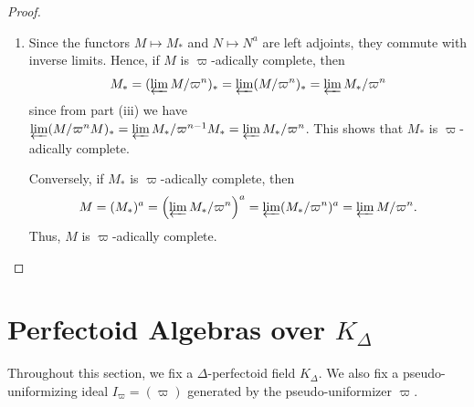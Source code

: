 \documentclass[12pts,a4paper]{amsart}
\begin{document}
\begin{proof}
\begin{enumerate}
    \item[(iv)] Since the functors $M \mapsto M_*$ and $N \mapsto N^a$ are left adjoints, they commute with inverse limits. Hence, if $M$ is $\varpi$-adically complete, then
    \begin{align*}
        M_*=(\varprojlim M/\varpi^n)_*=\varprojlim(M/\varpi^n)_*=\varprojlim M_*/\varpi^n
    \end{align*}
    since from part (iii) we have $\varprojlim (M/\varpi^n M)_*=\varprojlim M_*/\varpi^{n-1}M_*=\varprojlim M_*/\varpi^n$. This shows that $M_*$ is $\varpi$-adically complete.

    Conversely, if $M_*$ is $\varpi$-adically complete, then
    \begin{align*}
        M = (M_*)^a = \left(\varprojlim M_* / \varpi^n\right)^a = \varprojlim (M_* / \varpi^n)^a = \varprojlim M /\varpi^n.
    \end{align*}
    Thus, $M$ is $\varpi$-adically complete.
  \end{enumerate}
\end{proof}


\section{Perfectoid Algebras over $K_\Delta$}

Throughout this section, we fix a $\Delta$-perfectoid field $K_\Delta$. We also fix a pseudo-uniformizing ideal $I_\varpi=(\varpi)$ generated by the pseudo-uniformizer $\varpi$. 
\end{document}
